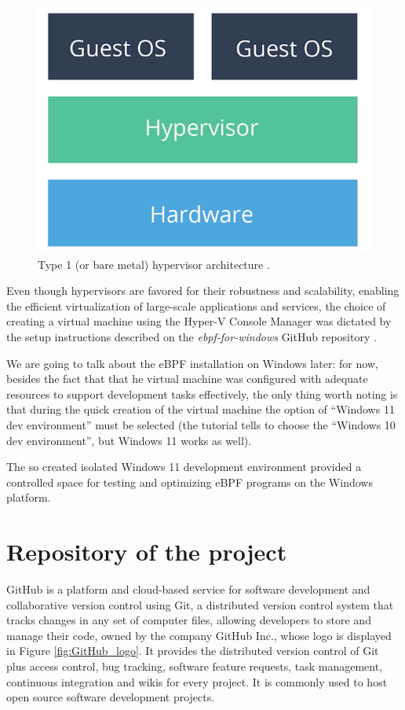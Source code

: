 \begin{figure}[h]
	\centering
	\includegraphics[width=0.7\linewidth]{images/Technologies/type_1_hypervisor.png}
	\caption{Type 1 (or bare metal) hypervisor architecture \cite{HypervisorsArchitectures}.}
	\label{fig:type_1_hypervisor}
\end{figure}

Even though hypervisors are favored for their robustness and scalability, enabling the efficient virtualization of large-scale applications and services, the choice of creating a virtual machine using the Hyper-V Console Manager was dictated by the setup instructions described on the \textit{ebpf-for-windows} GitHub repository \cite{VMSetup}.

We are going to talk about the eBPF installation on Windows later: for now, besides the fact that that he virtual machine was configured with adequate resources to support development tasks effectively, the only thing worth noting is that during the quick creation of the virtual machine the option of ``Windows 11 dev environment'' must be selected (the tutorial tells to choose the ``Windows 10 dev environment'', but Windows 11 works as well).  

The so created isolated Windows 11 development environment provided a controlled space for testing and optimizing eBPF programs on the Windows platform.

\section{Repository of the project}

GitHub is a platform and cloud-based service for software development and collaborative version control using Git, a distributed version control system that tracks changes in any set of computer files, allowing developers to store and manage their code, owned by the company GitHub Inc., whose logo is displayed in Figure \ref{fig:GitHub_logo}.
It provides the distributed version control of Git plus access control, bug tracking, software feature requests, task management, continuous integration and wikis for every project.
It is commonly used to host open source software development projects.

